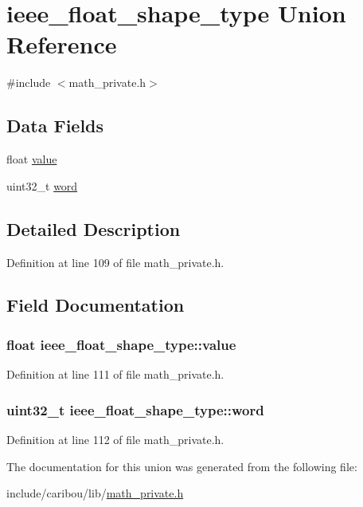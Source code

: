 \hypertarget{unionieee__float__shape__type}{\section{ieee\-\_\-float\-\_\-shape\-\_\-type Union Reference}
\label{unionieee__float__shape__type}
}


{\ttfamily \#include $<$math\-\_\-private.\-h$>$}

\subsection*{Data Fields}
\begin{DoxyCompactItemize}
\item 
float \hyperlink{unionieee__float__shape__type_aa0c47451f1b974421cbb9e2833ddb68e}{value}
\item 
uint32\-\_\-t \hyperlink{unionieee__float__shape__type_adb70a477cb0179659bb95dc6b1870b80}{word}
\end{DoxyCompactItemize}


\subsection{Detailed Description}


Definition at line 109 of file math\-\_\-private.\-h.



\subsection{Field Documentation}
\hypertarget{unionieee__float__shape__type_aa0c47451f1b974421cbb9e2833ddb68e}{
\subsubsection[{value}]{\setlength{\rightskip}{0pt plus 5cm}float ieee\-\_\-float\-\_\-shape\-\_\-type\-::value}}\label{unionieee__float__shape__type_aa0c47451f1b974421cbb9e2833ddb68e}


Definition at line 111 of file math\-\_\-private.\-h.

\hypertarget{unionieee__float__shape__type_adb70a477cb0179659bb95dc6b1870b80}{
\subsubsection[{word}]{\setlength{\rightskip}{0pt plus 5cm}uint32\-\_\-t ieee\-\_\-float\-\_\-shape\-\_\-type\-::word}}\label{unionieee__float__shape__type_adb70a477cb0179659bb95dc6b1870b80}


Definition at line 112 of file math\-\_\-private.\-h.



The documentation for this union was generated from the following file\-:\begin{DoxyCompactItemize}
\item 
include/caribou/lib/\hyperlink{math__private_8h}{math\-\_\-private.\-h}\end{DoxyCompactItemize}
